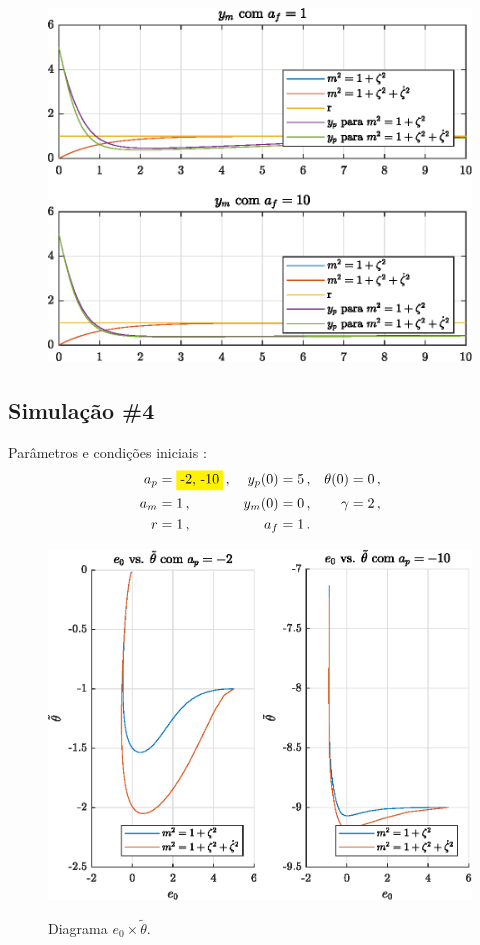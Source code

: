 \begin{figure}[H]
  \centering
  \includegraphics[width=12cm]{figs/yp/af1af10.eps} 
\end{figure}

\newpage%
\subsection{Simulação \#4}
\bigskip%
Parâmetros e condições iniciais  :
%
\begin{align*}
  a_p &= \HI{-2, -10}\,,  &  y_p(0) &= 5\,, & \theta(0) &= 0\,, \\
  a_m &= 1\,,   &  y_m(0) &= 0\,, & \gamma &= 2\,, \\
  r &= 1\,, & a_f &= 1\,.
\end{align*}

\bigskip%
\begin{figure}[H]
  \centering
  \includegraphics[width=12cm]{figs/e0_vs_deltatheta/ap-2ap-10.eps} \\[2mm]
  \caption{Diagrama $e_0 \times \tilde{\theta}$.}
\end{figure}

